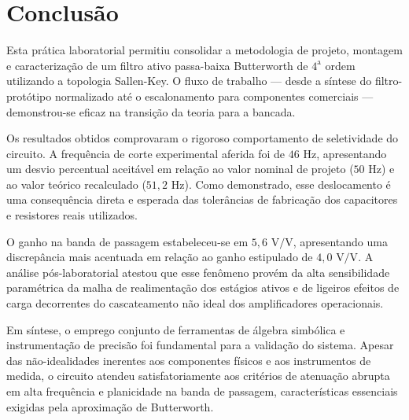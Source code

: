 \chapter{Conclusão}

Esta prática laboratorial permitiu consolidar a metodologia de projeto, montagem e caracterização de um filtro ativo passa-baixa Butterworth de $4^{\text{a}}$ ordem utilizando a topologia Sallen-Key. O fluxo de trabalho — desde a síntese do filtro-protótipo normalizado até o escalonamento para componentes comerciais — demonstrou-se eficaz na transição da teoria para a bancada.

Os resultados obtidos comprovaram o rigoroso comportamento de seletividade do circuito. A frequência de corte experimental aferida foi de $46\text{ Hz}$, apresentando um desvio percentual aceitável em relação ao valor nominal de projeto ($50\text{ Hz}$) e ao valor teórico recalculado ($51,2\text{ Hz}$). Como demonstrado, esse deslocamento é uma consequência direta e esperada das tolerâncias de fabricação dos capacitores e resistores reais utilizados.

O ganho na banda de passagem estabeleceu-se em $5,6\text{ V/V}$, apresentando uma discrepância mais acentuada em relação ao ganho estipulado de $4,0\text{ V/V}$. A análise pós-laboratorial atestou que esse fenômeno provém da alta sensibilidade paramétrica da malha de realimentação dos estágios ativos e de ligeiros efeitos de carga decorrentes do cascateamento não ideal dos amplificadores operacionais. 

Em síntese, o emprego conjunto de ferramentas de álgebra simbólica e instrumentação de precisão foi fundamental para a validação do sistema. Apesar das não-idealidades inerentes aos componentes físicos e aos instrumentos de medida, o circuito atendeu satisfatoriamente aos critérios de atenuação abrupta em alta frequência e planicidade na banda de passagem, características essenciais exigidas pela aproximação de Butterworth.